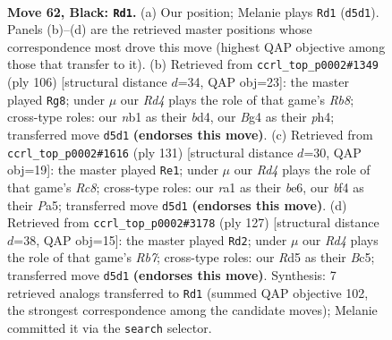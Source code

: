 \documentclass[11pt]{article}
\begin{document}
\clearpage

\begin{figure}[p]\centering
\begin{subfigure}{0.46\textwidth}\centering
\resizebox{\linewidth}{!}{%
\newchessgame
\chessboard[
  setfen={5k2/n1P4K/p7/P2r1p1p/4pBb1/6P1/8/RN6 b - - 31 62},
  showmover=false,
  pgfstyle=straightmove, color=movearrow, markmove={d5-d1}
]}
\caption{}
\end{subfigure}\hfill
\begin{subfigure}{0.46\textwidth}\centering
\resizebox{\linewidth}{!}{%
\newchessgame
\chessboard[
  setfen={1R6/4k3/8/1p2rpp1/1P1b3p/P4B1P/K5P1/8 w - - 20 54},
  showmover=false,
  pgfstyle=straightmove, color=movearrow, markmove={b8-g8}
]}
\caption{}
\end{subfigure}
\\[4pt]
\begin{subfigure}{0.46\textwidth}\centering
\resizebox{\linewidth}{!}{%
\newchessgame
\chessboard[
  setfen={8/6k1/1p2B3/p1p1p3/P1PbP3/5RP1/KP6/2r5 b - - 18 66},
  showmover=false,
  pgfstyle=straightmove, color=movearrow, markmove={c1-e1}
]}
\caption{}
\end{subfigure}\hfill
\begin{subfigure}{0.46\textwidth}\centering
\resizebox{\linewidth}{!}{%
\newchessgame
\chessboard[
  setfen={8/5k2/1pB4R/p1b3p1/P7/4P1K1/1r3P2/8 b - - 11 64},
  showmover=false,
  pgfstyle=straightmove, color=movearrow, markmove={b2-d2}
]}
\caption{}
\end{subfigure}
\caption{\textbf{Move 62, Black: \texttt{Rd1}.} (a) Our position; Melanie plays \texttt{Rd1} (\texttt{d5d1}). Panels (b)--(d) are the retrieved master positions whose correspondence most drove this move (highest QAP objective among those that transfer to it). (b) Retrieved from \texttt{ccrl\_top\_p0002\#1349} (ply 106) [structural distance $d$=34, QAP obj=23]: the master played \texttt{Rg8}; under $\mu$ our \emph{Rd4} plays the role of that game's \emph{Rb8}; cross-type roles: our \emph{n}b1 as their \emph{b}d4, our \emph{B}g4 as their \emph{p}h4; transferred move \texttt{d5d1} \textbf{(endorses this move)}. (c) Retrieved from \texttt{ccrl\_top\_p0002\#1616} (ply 131) [structural distance $d$=30, QAP obj=19]: the master played \texttt{Re1}; under $\mu$ our \emph{Rd4} plays the role of that game's \emph{Rc8}; cross-type roles: our \emph{r}a1 as their \emph{b}e6, our \emph{b}f4 as their \emph{P}a5; transferred move \texttt{d5d1} \textbf{(endorses this move)}. (d) Retrieved from \texttt{ccrl\_top\_p0002\#3178} (ply 127) [structural distance $d$=38, QAP obj=15]: the master played \texttt{Rd2}; under $\mu$ our \emph{Rd4} plays the role of that game's \emph{Rb7}; cross-type roles: our \emph{R}d5 as their \emph{B}c5; transferred move \texttt{d5d1} \textbf{(endorses this move)}. Synthesis: 7 retrieved analogs transferred to \texttt{Rd1} (summed QAP objective 102, the strongest correspondence among the candidate moves); Melanie committed it via the \texttt{search} selector.}
\label{fig:thought-m123}
\end{figure}
\end{document}
